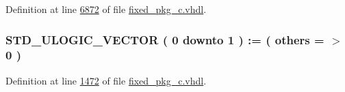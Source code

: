 Definition at line \hyperlink{fixed__pkg__c_8vhdl_source_l06872}{6872} of file \hyperlink{fixed__pkg__c_8vhdl_source}{fixed\+\_\+pkg\+\_\+c.\+vhdl}.

\hypertarget{class__fixed__pkg_a3575e58926817f265cfa6d013accb240}{}
\subsubsection[{N\+S\+L\+V}]{ {\bfseries \textcolor{comment}{S\+T\+D\+\_\+\+U\+L\+O\+G\+I\+C\+\_\+\+V\+E\+C\+T\+O\+R}\textcolor{vhdlchar}{ }\textcolor{vhdlchar}{(}\textcolor{vhdlchar}{ }\textcolor{vhdlchar}{ } \textcolor{vhdldigit}{0} \textcolor{vhdlchar}{ }\textcolor{keywordflow}{downto}\textcolor{vhdlchar}{ }\textcolor{vhdlchar}{ } \textcolor{vhdldigit}{1} \textcolor{vhdlchar}{ }\textcolor{vhdlchar}{)}\textcolor{vhdlchar}{ }\textcolor{vhdlchar}{ }\textcolor{vhdlchar}{ }\textcolor{vhdlchar}{\+:}\textcolor{vhdlchar}{=}\textcolor{vhdlchar}{ }\textcolor{vhdlchar}{(}\textcolor{vhdlchar}{ }\textcolor{vhdlchar}{ }\textcolor{keywordflow}{others}\textcolor{vhdlchar}{ }\textcolor{vhdlchar}{ }\textcolor{vhdlchar}{=}\textcolor{vhdlchar}{ }\textcolor{vhdlchar}{$>$}\textcolor{vhdlchar}{ }\textcolor{vhdlchar}{\textquotesingle{}}\textcolor{vhdlchar}{ } \textcolor{vhdldigit}{0} \textcolor{vhdlchar}{ }\textcolor{vhdlchar}{\textquotesingle{}}\textcolor{vhdlchar}{ }\textcolor{vhdlchar}{)}\textcolor{vhdlchar}{ }} \hspace{0.3cm}{\ttfamily [Constant]}}\label{class__fixed__pkg_a3575e58926817f265cfa6d013accb240}


Definition at line \hyperlink{fixed__pkg__c_8vhdl_source_l01472}{1472} of file \hyperlink{fixed__pkg__c_8vhdl_source}{fixed\+\_\+pkg\+\_\+c.\+vhdl}.

\hypertarget{class__fixed__pkg_a88459acb584ef0053a7b4eafa97ad818}{}
